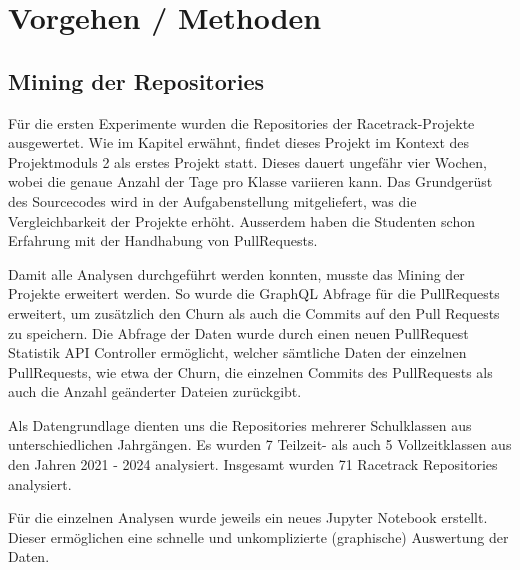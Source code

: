 


\chapter{Vorgehen / Methoden} %

\label{Chapter3} %


\section{Mining der Repositories}
Für die ersten Experimente wurden die Repositories der Racetrack-Projekte ausgewertet. Wie im Kapitel  erwähnt, findet dieses Projekt im Kontext des Projektmoduls 2 als erstes Projekt statt. Dieses dauert ungefähr vier Wochen, wobei die genaue Anzahl der Tage pro Klasse variieren kann. Das Grundgerüst des Sourcecodes wird in der Aufgabenstellung mitgeliefert, was die Vergleichbarkeit der Projekte erhöht. Ausserdem haben die Studenten schon Erfahrung mit der Handhabung von PullRequests. 

Damit alle Analysen durchgeführt werden konnten, musste das Mining der Projekte erweitert werden. So wurde die GraphQL Abfrage für die PullRequests erweitert, um zusätzlich den Churn als auch die Commits auf den Pull Requests zu speichern. Die Abfrage der Daten wurde durch einen neuen PullRequest Statistik API Controller ermöglicht, welcher sämtliche Daten der einzelnen PullRequests, wie etwa der Churn, die einzelnen Commits des PullRequests als auch die Anzahl geänderter Dateien zurückgibt. 

Als Datengrundlage dienten uns die Repositories mehrerer Schulklassen aus unterschiedlichen Jahrgängen. Es wurden 7 Teilzeit- als auch 5 Vollzeitklassen aus den Jahren 2021 - 2024 analysiert. Insgesamt wurden 71 Racetrack Repositories analysiert. 

Für die einzelnen Analysen wurde jeweils ein neues Jupyter Notebook erstellt. Dieser ermöglichen eine schnelle und unkomplizierte (graphische) Auswertung der Daten. \parencite{stumpf_simon_repo-detectivesba-metric-analysis-scripts_nodate}

